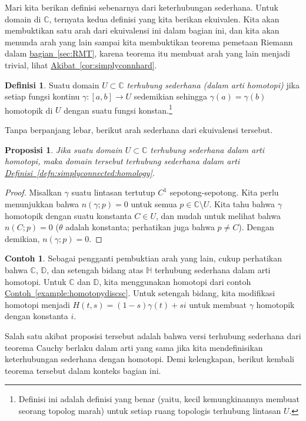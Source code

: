 \documentclass[12pt,openany]{book}
\newcommand{\C}{{\mathbb{C}}}
\newcommand{\D}{{\mathbb{D}}}
\newcommand{\bH}{{\mathbb{H}}}
\theoremstyle{plain}
\newtheorem{prop}[thm]{Proposisi}
\theoremstyle{remark}
\theoremstyle{definition}
\newtheorem{defn}[thm]{Definisi}
\theoremstyle{exercise}
\theoremstyle{example}
\newtheorem{example}[thm]{Contoh}
\newcommand{\sectionref}[1]{\hyperref[#1]{bagian~\ref*{#1}}}
\newcommand{\exampleref}[1]{\hyperref[#1]{Contoh~\ref*{#1}}}
\newcommand{\corref}[1]{\hyperref[#1]{Akibat~\ref*{#1}}}
\newcommand{\defnref}[1]{\hyperref[#1]{Definisi~\ref*{#1}}}
\begin{document}
Mari kita berikan definisi sebenarnya dari keterhubungan sederhana.
Untuk domain di $\C$, ternyata
kedua definisi yang kita berikan ekuivalen.
Kita akan membuktikan satu arah dari ekuivalensi ini dalam bagian ini,
dan kita akan menunda arah yang lain sampai kita membuktikan teorema pemetaan
Riemann dalam \sectionref{sec:RMT},
karena teorema itu membuat arah yang lain menjadi trivial, lihat
\corref{cor:simplyconnhard}.

\begin{defn}
Suatu domain $U \subset \C$
\emph{terhubung sederhana (dalam arti homotopi)}%
jika setiap fungsi kontinu $\gamma \colon [a,b] \to U$ sedemikian sehingga $\gamma(a) =
\gamma(b)$ homotopik di $U$ dengan suatu fungsi konstan.\footnote{%
Definisi ini adalah definisi yang benar (yaitu, kecil kemungkinannya membuat seorang topolog marah)
untuk setiap ruang topologis terhubung lintasan $U$.}
\end{defn}

Tanpa berpanjang lebar, berikut arah sederhana dari ekuivalensi tersebut.

\begin{prop} \label{prop:simplyconneasy}
Jika suatu domain $U \subset \C$ terhubung sederhana dalam arti homotopi,
maka domain tersebut terhubung sederhana dalam arti
\defnref{defn:simplyconnected:homology}.
\end{prop}

\begin{proof}
Misalkan $\gamma$ suatu lintasan tertutup $C^1$ sepotong-sepotong. Kita perlu menunjukkan
bahwa $n(\gamma;p) = 0$ untuk semua $p \in \C \setminus U$.
Kita tahu bahwa $\gamma$ homotopik dengan suatu konstanta $C \in U$, dan mudah
untuk melihat bahwa $n(C;p) = 0$ ($\theta$
adalah konstanta; perhatikan juga bahwa $p \neq C$).
Dengan demikian, $n(\gamma;p) = 0$.
\end{proof}

\begin{example}
Sebagai pengganti pembuktian arah yang lain, cukup perhatikan bahwa
$\C$, $\D$, dan setengah bidang atas $\bH$ terhubung sederhana dalam 
arti homotopi. Untuk $\C$ dan $\D$, kita menggunakan homotopi dari
contoh \exampleref{example:homotopydiscsc}. Untuk setengah bidang,
kita modifikasi homotopi menjadi $H(t,s) = (1-s)\gamma(t) + si$ untuk
membuat $\gamma$ homotopik dengan konstanta $i$.
\end{example}

Salah satu akibat proposisi tersebut adalah bahwa
versi terhubung sederhana dari teorema Cauchy berlaku dalam arti yang sama
jika kita mendefinisikan keterhubungan sederhana dengan homotopi. Demi
kelengkapan, berikut kembali teorema tersebut dalam konteks bagian ini.
\end{document}
